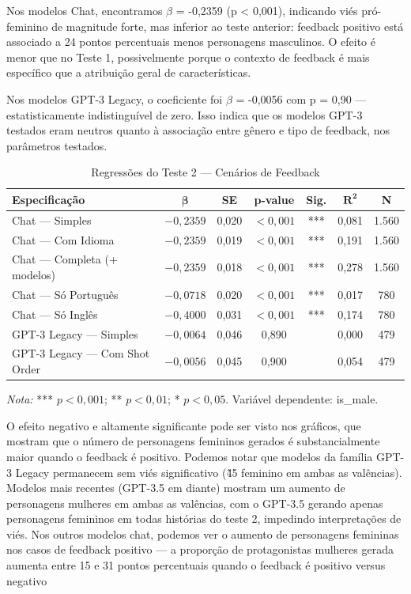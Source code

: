 \documentclass[12pt,a4paper]{article}
\begin{document}
Nos modelos Chat, encontramos $\beta$ = -0,2359 (p < 0,001), indicando viés
pró-feminino de magnitude forte, mas inferior ao teste anterior:
feedback positivo está associado a 24 pontos percentuais menos
personagens masculinos. O efeito é menor que no Teste 1, possivelmente
porque o contexto de feedback é mais específico que a atribuição geral
de características.

Nos modelos GPT-3 Legacy, o coeficiente foi $\beta$ = -0,0056 com p = 0,90 ---
estatisticamente indistinguível de zero. Isso indica que os modelos
GPT-3 testados eram neutros quanto à associação entre gênero e tipo de
feedback, nos parâmetros testados.

\begin{table}[H]
\centering
\caption{Regressões do Teste 2 --- Cenários de Feedback}
\label{tab:reg-teste2}
\begin{tabular}{lcccccc}
\toprule
\textbf{Especificação} & $\boldsymbol{\beta}$ & \textbf{SE} & \textbf{p-value} & \textbf{Sig.} & $\boldsymbol{R^2}$ & \textbf{N} \\
\midrule
Chat --- Simples & $-0,2359$ & 0,020 & $<0,001$ & *** & 0,081 & 1.560 \\
Chat --- Com Idioma & $-0,2359$ & 0,019 & $<0,001$ & *** & 0,191 & 1.560 \\
Chat --- Completa (+ modelos) & $-0,2359$ & 0,018 & $<0,001$ & *** & 0,278 & 1.560 \\
Chat --- Só Português & $-0,0718$ & 0,020 & $<0,001$ & *** & 0,017 & 780 \\
Chat --- Só Inglês & $-0,4000$ & 0,031 & $<0,001$ & *** & 0,174 & 780 \\
GPT-3 Legacy --- Simples & $-0,0064$ & 0,046 & 0,890 & & 0,000 & 479 \\
GPT-3 Legacy --- Com Shot Order & $-0,0056$ & 0,045 & 0,900 & & 0,054 & 479 \\
\bottomrule
\end{tabular}

\smallskip
\footnotesize\textit{Nota:} *** $p < 0,001$; ** $p < 0,01$; * $p < 0,05$. Variável dependente: is\_male.
\end{table}

O efeito negativo e altamente significante pode ser visto nos gráficos,
que mostram que o número de personagens femininos gerados é
substancialmente maior quando o feedback é positivo. Podemos notar que
modelos da família GPT-3 Legacy permanecem sem viés significativo (\~45%
feminino em ambas as valências). Modelos mais recentes (GPT-3.5 em
diante) mostram um aumento de personagens mulheres em ambas as
valências, com o GPT-3.5 gerando apenas personagens femininos em todas
histórias do teste 2, impedindo interpretações de viés. Nos outros
modelos chat, podemos ver o aumento de personagens femininas nos casos
de feedback positivo --- a proporção de protagonistas mulheres gerada
aumenta entre 15 e 31 pontos percentuais quando o feedback é positivo
versus negativo
\end{document}
